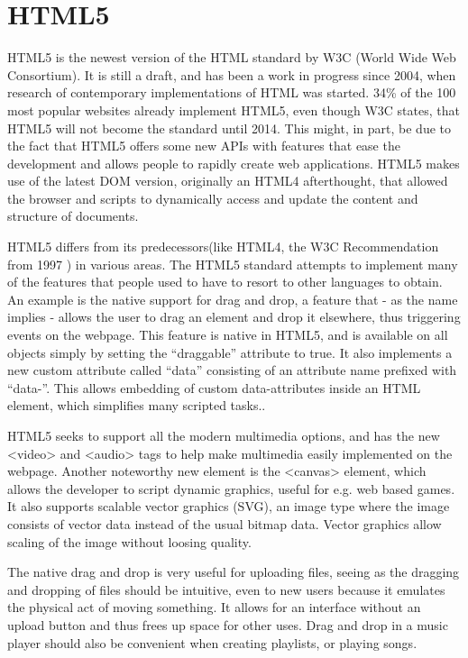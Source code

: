 \section{HTML5}
HTML5 is the newest version of the HTML standard by W3C (World Wide Web
Consortium). It is still a draft, and has been a work in progress since 2004, 
when research of contemporary implementations of HTML was started. 
34\% of the 100 most popular websites already implement HTML5\cite{Maine11}, 
even though W3C states, that HTML5 will not become the standard until 2014.\cite{W3C11} This might, in part, 
be due to the fact that HTML5 offers some new APIs with features that ease the
development and allows people to rapidly create web applications.
HTML5 makes use of the latest DOM version, originally an HTML4
afterthought, that allowed the browser and scripts to dynamically access and
update the content and structure of documents\cite{Hegaret05}.


HTML5 differs from its predecessors(like HTML4, the W3C Recommendation from 1997 \cite{Kesteren11}) in various areas. 
The HTML5 standard attempts to implement many of the features that people used
to have to resort to other languages to obtain.
An example is the native support for drag and drop, a feature that - as the name
implies - allows the user to drag an element and drop it elsewhere, thus
triggering events on the webpage.
This feature is native in HTML5, and is available on all objects simply by setting the ``draggable'' attribute to true. 
It also implements a new custom attribute called ``data'' 
consisting of an attribute name prefixed with ``data-''. This allows embedding
of custom data-attributes inside an HTML element, which simplifies many
scripted tasks.\cite{Bewick10}.


HTML5 seeks to support all the modern multimedia options, 
and has the new <video> and <audio> tags to help make multimedia easily implemented on the webpage. 
Another noteworthy new element is the <canvas> element, 
which allows the developer to script dynamic graphics, useful for e.g.
web based games. 
It also supports scalable vector graphics (SVG), an image type where the image
consists of vector data instead of the usual bitmap data. Vector graphics allow
scaling of the image without loosing quality.


The native drag and drop is very useful for uploading files, 
seeing as the dragging and dropping of files should be intuitive, even to new users because it emulates the physical act of moving something.
It allows for an interface without an upload button and thus frees up space for other uses. 
Drag and drop in a music player should also be convenient when creating playlists, or playing songs.


